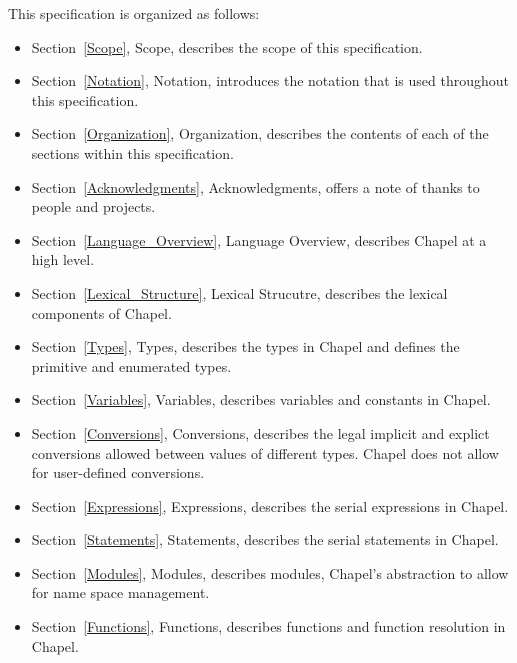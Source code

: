 \label{Organization}

This specification is organized as follows:
\begin{itemize}

\item
Section~\ref{Scope}, Scope, describes the scope of this specification.

\item
Section~\ref{Notation}, Notation, introduces the notation that is used
throughout this specification.

\item
Section~\ref{Organization}, Organization, describes the contents of
each of the sections within this specification.

\item
Section~\ref{Acknowledgments}, Acknowledgments, offers a note of
thanks to people and projects.

\item
Section~\ref{Language_Overview}, Language Overview, describes Chapel
at a high level.

\item
Section~\ref{Lexical_Structure}, Lexical Strucutre, describes the
lexical components of Chapel.

\item
Section~\ref{Types}, Types, describes the types in Chapel and defines
the primitive and enumerated types.

\item
Section~\ref{Variables}, Variables, describes variables and constants
in Chapel.

\item
Section~\ref{Conversions}, Conversions, describes the legal implicit
and explict conversions allowed between values of different types.
Chapel does not allow for user-defined conversions.

\item
Section~\ref{Expressions}, Expressions, describes the serial
expressions in Chapel.

\item
Section~\ref{Statements}, Statements, describes the serial statements
in Chapel.

\item
Section~\ref{Modules}, Modules, describes modules, Chapel's
abstraction to allow for name space management.

\item
Section~\ref{Functions}, Functions, describes functions and function
resolution in Chapel.


\end{itemize}
